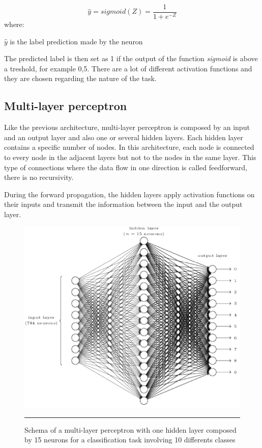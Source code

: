 \begin{equation}
{\hat{y}} = {sigmoid(Z)}=\frac{1}{1+e^{-Z} }
\end{equation}
where:

$\hat{y}$ is the label prediction made by the neuron

The predicted label is then set as 1 if the output of the function \emph{sigmoid} is above a treshold, for example 0,5. There are a lot of different activation functions and they are chosen regarding the nature of the task. 




\subsection{Multi-layer perceptron}

Like the previous architecture, multi-layer perceptron is composed by an input and an output layer and also one or several hidden layers. Each hidden layer contains a specific number of nodes. In this architecture, each node is connected to every node in the adjacent layers but not to the nodes in the same layer. This type of connections where the data flow in one direction is called feedforward, there is no recursivity. 

During the forward propagation, the hidden layers apply activation functions on their inputs and transmit the information between the input and the output layer.



\begin{figure}[H]
  \centering
    \includegraphics[width=\textwidth]{Figures/multi_layer.png}
    \rule{35em}{0.5pt}
  \caption[Schema of a multi-layer perceptron]{Schema of a multi-layer perceptron with one hidden layer composed by 15 neurons for a classification task involving 10 differents classes}
  \label{fig:Muli-layer perceptron}
\end{figure}

